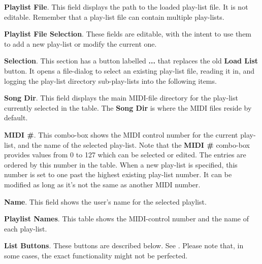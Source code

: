    \begin{enumber}
      \item \textbf{Playlist File}.
         This field displays the path to the loaded
         play-list file.  It is not editable.  Remember that
         a play-list file can contain multiple play-lists.
      \item \textbf{Playlist File Selection}.
         These fields are editable, with the intent to use them to add a new
         play-list or modify the current one.
         \begin{enumber}
            \item \textbf{Selection}.
               This section has a button labelled \textbf{...} that
               replaces the old \textbf{Load List} button.
               It opens a file-dialog to select an existing play-list
               file, reading it in, and logging the play-list directory
               sub-play-lists into the following items.
            \item \textbf{Song Dir}.
               This field displays the main MIDI-file directory
               for the play-list currently selected in the table.
               The \textbf{Song Dir} is where the MIDI files reside by default.
            \item \textbf{MIDI \#}.
               This combo-box shows the MIDI control number for the current
               play-list, and the name of the selected play-list.
               Note that the \textbf{MIDI \#} combo-box provides values from
               0 to 127 which can be selected or edited.
               The entries are ordered by this number in the table.
               When a new play-list is specified, this number is
               set to one past the highest existing play-list number.
               It can be modified as long as it's not the same as
               another MIDI number.
            \item \textbf{Name}.
               This field shows the user's name for the selected playlist.
         \end{enumber}
      \item \textbf{Playlist Names}.
         This table shows the MIDI-control number and
         the name of each play-list.
      \item \textbf{List Buttons}.
         These buttons are described below.
         See .
         Please note that, in some cases, the exact functionality might
         not be perfected.
   \end{enumber}


